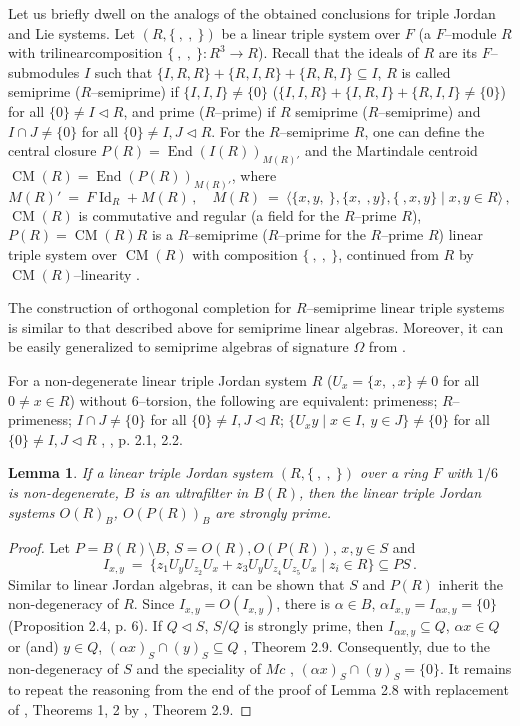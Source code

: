 \documentclass[a4paper,11pt]{article}
\newtheorem{lemma}[defi]{Lemma}
\DeclareMathOperator{\Id}{Id}
\DeclareMathOperator{\End}{End}
\DeclareMathOperator{\CM}{CM}
\begin{document}
Let us briefly dwell on the analogs of the obtained conclusions for triple 
Jordan and Lie systems.
Let ${(R, \{\ ,\ ,\ \})}$ be a linear triple system over $F$ (a $F$--module 
$R$ with trilinear\linebreak composition ${\{\ ,\ ,\ \}: R^3\longrightarrow R}$). 
Recall that the ideals of $R$ are its $F$--submodules $I$ such that 
${\{I, R, R\}+\{R, I, R\}+\{R, R, I\}\subseteq I}$, $R$ is called semiprime 
($R$--semiprime) if ${\{I, I, I\}\ne \{0\}}$ 
(${\{I, I, R\}+\{I, R, I\}+\{R, I, I\}\ne \{0\}}$) for all 
${\{0\}\ne I\lhd R}$, and prime ($R$--prime) if $R$ semi\-prime 
($R$--semiprime) and ${I\cap J\ne \{0\}}$ for all ${\{0\}\ne I, J\lhd R}$. 
For the $R$--semiprime $R$, one can define the central closure 
${P(R)=\End(I(R))_{M(R)'}}$ and the Martindale centroid  
$\CM(R)=\End(P(R))_{M(R)'}$, where  
\[
M(R)'\ =\ F \Id_R+M(R)\,,\quad 
M(R)\ =\ \langle \{x, y,\ \}, \{x,\ ,y\}, \{\ , x, y\}\mid 
x, y\in R\rangle\,,
\]
$\CM(R)$ is commutative and regular (a field for the $R$--prime $R$), 
${P(R)=\CM(R) R}$ is a $R$--semiprime ($R$--prime for the $R$--prime $R$) 
linear triple system over $\CM(R)$ with composition ${\{\ ,\ ,\ \}}$, 
continued from $R$ by $\CM(R)$--linearity \cite{Raz, Gol6}. 

The construction of orthogonal completion for $R$--semiprime linear triple 
systems is similar to that described above for semiprime linear algebras. 
Moreover, it can be easily generalized to semiprime algebras of signature 
$\Omega$ from \cite{Raz}.

For a non-degenerate linear triple Jordan system $R$  
(${U_x=\{x,\ , x\}\ne 0}$ for all ${0\ne x\in R}$) without $6$--torsion, 
the following are equivalent: primeness; $R$--primeness; 
${I\cap J\ne \{0\}}$ for all ${\{0\}\ne I, J\lhd R}$; 
${\{U_x y\mid x\in I,\ y\in J\}\ne \{0\}}$ for all 
${\{0\}\ne I, J\lhd R}$ \cite{ACLM}, \cite{LP}, p. 2.1, 2.2. 

\begin{lemma}
If a linear triple Jordan system ${(R, \{\ ,\ ,\ \})}$ over a ring $F$ 
with $1/6$ is non-dege\-nerate, $B$ is an ultrafilter in $B(R)$, then the 
linear triple Jordan systems $O(R)_B$, $O(P(R))_B$ are strongly prime.
\end{lemma}

\begin{proof}
Let ${P=B(R)\setminus B}$, ${S=O(R), O(P(R))}$, ${x, y\in S}$ and 
\[
I_{x, y}\ =\ \{z_1 U_y U_{z_2} U_x+z_3 U_y U_{z_4} U_{z_5} U_x
\mid z_i\in R\}\subseteq P S\,.
\]
Similar to linear Jordan algebras, it can be shown that $S$ and $P(R)$ inherit 
the non-degeneracy of $R$. Since ${I_{x, y}=O(I_{x, y})}$, there is 
${\alpha\in B}$, ${\alpha I_{x, y}=I_{\alpha x, y}=\{0\}}$ 
(Proposition 2.4, p. 6). If ${Q\lhd S}$, $S/Q$ is 
strongly prime, then ${I_{\alpha x, y}\subseteq Q}$, ${\alpha x\in Q}$ or 
(and) ${y\in Q}$, ${(\alpha x)_S\cap (y)_S\subseteq Q}$ \cite{ACLM}, 
Theorem 2.9. Consequently, due to the non-degeneracy of $S$ and the 
speciality of $Mc$ \cite{ZelM}, ${(\alpha x)_S\cap (y)_S=\{0\}}$. 
It remains to repeat the reasoning from the end of the proof of Lemma 2.8 
with replacement of \cite{BMS}, Theorems 1, 2 by \cite{ACLM}, Theorem 2.9.
\end{proof}
\end{document}
